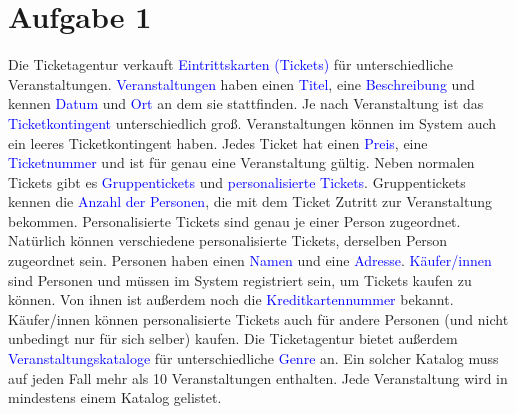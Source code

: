 \chapter*{Aufgabe 1}
    Die Ticketagentur verkauft \textcolor{blue}{Eintrittskarten (Tickets)} für unterschiedliche Veranstaltungen. \textcolor{blue}{Veranstaltungen} haben
    einen \textcolor{blue}{Titel}, eine \textcolor{blue}{Beschreibung} und kennen \textcolor{blue}{Datum} und \textcolor{blue}{Ort} an dem sie stattfinden. Je nach Veranstaltung ist das
    \textcolor{blue}{Ticketkontingent} unterschiedlich groß. Veranstaltungen können im System auch ein leeres Ticketkontingent haben.
    Jedes Ticket hat einen \textcolor{blue}{Preis}, eine \textcolor{blue}{Ticketnummer} und ist für genau eine Veranstaltung gültig. Neben normalen
    Tickets gibt es \textcolor{blue}{Gruppentickets} und \textcolor{blue}{personalisierte Tickets}. Gruppentickets kennen die \textcolor{blue}{Anzahl der Personen}, die mit
    dem Ticket Zutritt zur Veranstaltung bekommen. Personalisierte Tickets sind genau je einer Person zugeordnet.
    Natürlich können verschiedene personalisierte Tickets, derselben Person zugeordnet sein. Personen haben einen
    \textcolor{blue}{Namen} und eine \textcolor{blue}{Adresse}.
    \textcolor{blue}{Käufer/innen} sind Personen und müssen im System registriert sein, um Tickets kaufen zu können. Von ihnen ist
    außerdem noch die \textcolor{blue}{Kreditkartennummer} bekannt. Käufer/innen können personalisierte Tickets auch für andere
    Personen (und nicht unbedingt nur für sich selber) kaufen.
    Die Ticketagentur bietet außerdem \textcolor{blue}{Veranstaltungskataloge} für unterschiedliche \textcolor{blue}{Genre} an. Ein solcher Katalog muss
    auf jeden Fall mehr als 10 Veranstaltungen enthalten. Jede Veranstaltung wird in mindestens einem Katalog gelistet.